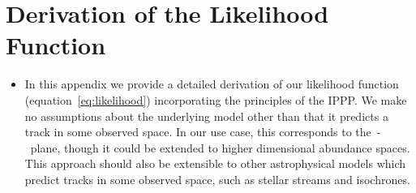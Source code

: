 \documentclass[ms.tex]{subfiles}
\begin{document}
\section{Derivation of the Likelihood Function}
\label{sec:l_derivation}

\begin{itemize}

	\item In this appendix we provide a detailed derivation of our likelihood
	function (equation~\ref{eq:likelihood}) incorporating the principles of the
	IPPP.
	We make no assumptions about the underlying model other than that it
	predicts a track in some observed space.
	In our use case, this corresponds to the~\afe-\feh~plane, though it could
	be extended to higher dimensional abundance spaces.
	This approach should also be extensible to other astrophysical models which
	predict tracks in some observed space, such as stellar streams and
	isochrones.


\end{itemize}
\end{document}
